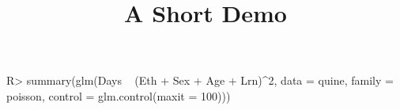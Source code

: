 \documentclass[article]{jss}
\title{A Short Demo}
\begin{document}
\begin{CodeInput}
R> summary(glm(Days ~ (Eth + Sex + Age + Lrn)^2, data = quine, family = poisson, control = glm.control(maxit = 100)))
\end{CodeInput}
\end{document}
